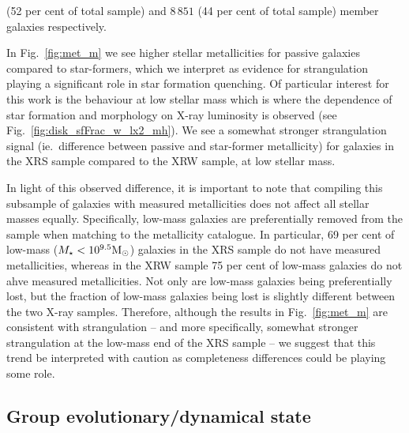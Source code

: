 (52 per cent of total sample) and $8\,851$ (44 per cent of total
sample) member galaxies respectively.
\par
In Fig.~\ref{fig:met_m} we see higher stellar metallicities for
passive galaxies compared to star-formers, which we interpret as
evidence for strangulation playing a significant role in star
formation quenching.  Of particular interest for this work is the
behaviour at low stellar mass which is where the dependence of star
formation and morphology on X-ray luminosity is observed (see
Fig.~\ref{fig:disk_sfFrac_w_lx2_mh}).  We see a somewhat stronger
strangulation signal (ie.\ difference between passive and star-former
metallicity) for galaxies in the XRS sample compared to the XRW
sample, at low stellar mass.
\par
In light of this observed difference, it is important to note that
compiling this subsample of galaxies with measured metallicities does
not affect all stellar masses equally.  Specifically, low-mass
galaxies are preferentially removed from the sample when matching to
the metallicity catalogue.  In particular, 69 per cent of low-mass
($M_\star < 10^{9.5}\mathrm{M_{\odot}}$) galaxies in the XRS sample do not have
measured metallicities, whereas in the XRW sample 75 per cent of
low-mass galaxies do not ahve measured metallicities.  Not only are
low-mass galaxies being preferentially lost, but the fraction of
low-mass galaxies being lost is slightly different between the two
X-ray samples.  Therefore, although the results in
Fig.~\ref{fig:met_m} are consistent with strangulation -- and more
specifically, somewhat stronger strangulation at the low-mass end of
the XRS sample -- we suggest that this trend be interpreted with
caution as completeness differences could be playing some role.

\subsection{Group evolutionary/dynamical state}

